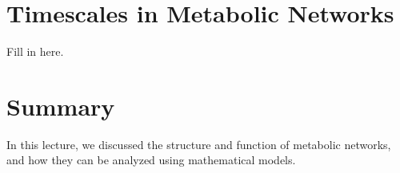 \documentclass{article}[12pt]
\begin{document}
\section{Timescales in Metabolic Networks}
Fill in here.

\section{Summary}
In this lecture, we discussed the structure and function of metabolic networks, and how they can be analyzed using mathematical models.






\end{document}
